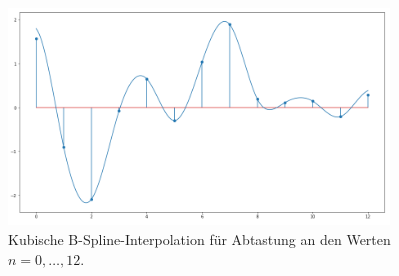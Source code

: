 %
\begin{figure}[t]
    \centering\includegraphics[width=0.9\textwidth]{img/bsplines/interpol.png}
    \caption{Kubische B-Spline-Interpolation f\"ur Abtastung an den Werten $n = 0, \dots, 12$.}\label{bsplines_interpol_pic}
\end{figure}
%
%
%
